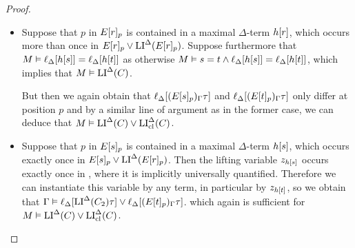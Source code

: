 \documentclass[,%
	draft=false,%
	numbers=noendperiod
	11pt,
	a4paper,
	oneside,%
	openany,
]{memoir}
\begin{document}
\begin{proof}
\begin{description}
\begin{itemize}

				\item 
					Suppose that $p$ in $E{[r]_{p}}$ is contained in a maximal $\Delta$-term $h[r]$, which occurs more than once in $E{[r]_{p}} \lor \operatorname{LI}^\Delta(E{[r]_{p}})$. 
					Suppose furthermore that $M\vDash \ell_{\Delta}[h[s]] = \ell_{\Delta}[h[t]]$ as otherwise $M \entails s=\nolinebreak t \land \lifdeltanovar{h\occ{s}} = \lifdeltanovar{h\occ{t}}$, which implies that $M \vDash \operatorname{LI}^\Delta(C)$.

					But then we again obtain that 
					$\ell_{\Delta}[ (E{[s]_{p}})_\Gamma \tau ]$ and $\ell_{\Delta}[ (E{[t]_{p}})_\Gamma \tau]$ only differ at position $p$ and
					by a similar line of argument as in the former case, we can deduce that 
					$M \vDash \operatorname{LI}^\Delta(C) \lor \operatorname{LI}_{\operatorname{cl}}^\Delta(C)$.

				\item 
					Suppose that $p$ in $E{[s]_{p}}$ is contained in a maximal $\Delta$-term $h[s]$, which occurs exactly once in $E{[s]_{p}} \lor \operatorname{LI}^\Delta(E{[r]_{p}})$. 
					Then the lifting variable $z_{h[s]}$ occurs exactly once in \markB, where it is implicitly universally quantified. 
					Therefore we can instantiate this variable by any term, in particular by $z_{h[t]}$, 
					so we obtain that 
					$\Gamma \vDash \ell_{\Delta}[\operatorname{LI}^\Delta(C_2)\tau] \lor \ell_{\Delta}[(E{[t]_{p}})_\Gamma \tau]$.
					which again is sufficient for
					$M \vDash \operatorname{LI}^\Delta(C) \lor \operatorname{LI}_{\operatorname{cl}}^\Delta(C)$.
					\qedhere
			\end{itemize}

	\end{description}
\end{proof}
\end{document}
